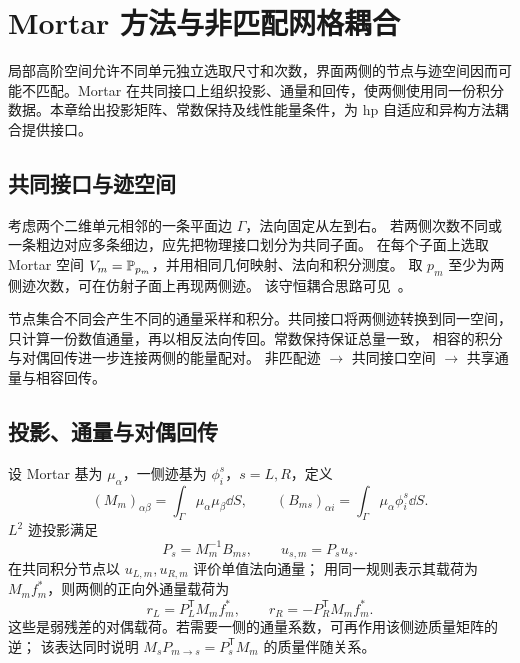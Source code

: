 \chapter{Mortar 方法与非匹配网格耦合}\label{ch:13}
\begin{chaptersummary}
局部高阶空间允许不同单元独立选取尺寸和次数，界面两侧的节点与迹空间因而可能不匹配。Mortar 在共同接口上组织投影、通量和回传，使两侧使用同一份积分数据。本章给出投影矩阵、常数保持及线性能量条件，为 hp 自适应和异构方法耦合提供接口。
\end{chaptersummary}

\section{共同接口与迹空间}
考虑两个二维单元相邻的一条平面边 $\Gamma$，法向固定从左到右。
若两侧次数不同或一条粗边对应多条细边，应先把物理接口划分为共同子面。
在每个子面上选取 Mortar 空间 $V_m=\mathbb P_{p_m}$，并用相同几何映射、法向和积分测度。
取 $p_m$ 至少为两侧迹次数，可在仿射子面上再现两侧迹。
该守恒耦合思路可见~\cite{kopriva1996}。

{节点集合不同会产生不同的通量采样和积分。共同接口将两侧迹转换到同一空间，
只计算一份数值通量，再以相反法向传回。常数保持保证总量一致，
相容的积分与对偶回传进一步连接两侧的能量配对。}
{非匹配迹 $\longrightarrow$ 共同接口空间 $\longrightarrow$ 共享通量与相容回传。}

\section{投影、通量与对偶回传}
设 Mortar 基为 $\mu_\alpha$，一侧迹基为 $\phi_i^s$，$s=L,R$，定义
\[
(M_m)_{\alpha\beta}=\int_\Gamma\mu_\alpha\mu_\beta\dd S,\qquad
(B_{ms})_{\alpha i}=\int_\Gamma\mu_\alpha\phi_i^s\dd S.
\]
$L^2$ 迹投影满足
\begin{equation}\label{eq:mortar-proj}
P_s=M_m^{-1}B_{ms},\qquad u_{s,m}=P_su_s.
\end{equation}
在共同积分节点以 $u_{L,m},u_{R,m}$ 评价单值法向通量；
用同一规则表示其载荷为 $M_mf_m^*$，则两侧的正向外通量载荷为
\begin{equation}\label{eq:mortar-return}
r_L=P_L^{\mathsf T}M_mf_m^*,\qquad
r_R=-P_R^{\mathsf T}M_mf_m^*.
\end{equation}
这些是弱残差的对偶载荷。若需要一侧的通量系数，可再作用该侧迹质量矩阵的逆；
该表达同时说明 $M_sP_{m\to s}=P_s^{\mathsf T}M_m$ 的质量伴随关系。

